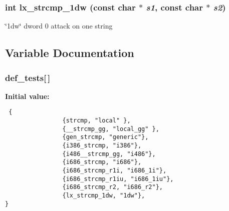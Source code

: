 \subsubsection{\setlength{\rightskip}{0pt plus 5cm}int lx\_\-strcmp\_\-1dw (const char $\ast$ {\em s1}, const char $\ast$ {\em s2})}\label{strcmp_2def__test_8h_a13}


\char`\"{}1dw\char`\"{} dword 0 attack on one string 

\subsection{Variable Documentation}
\subsubsection{ def\_\-tests[$\,$]}\label{strcmp_2def__test_8h_a4}


{\bf Initial value:}

\footnotesize\begin{verbatim} {
                {strcmp, "local" },
                {__strcmp_gg, "local_gg" },
                {gen_strcmp, "generic"}, 
                {i386_strcmp, "i386"},  
                {i486__strcmp_gg, "i486"},      
                {i686_strcmp, "i686"},  
                {i686_strcmp_r1i, "i686_1i"},   
                {i686_strcmp_r1iu, "i686_1iu"},
                {i686_strcmp_r2, "i686_r2"},
                {lx_strcmp_1dw, "1dw"}, 
}\end{verbatim}\normalsize 
